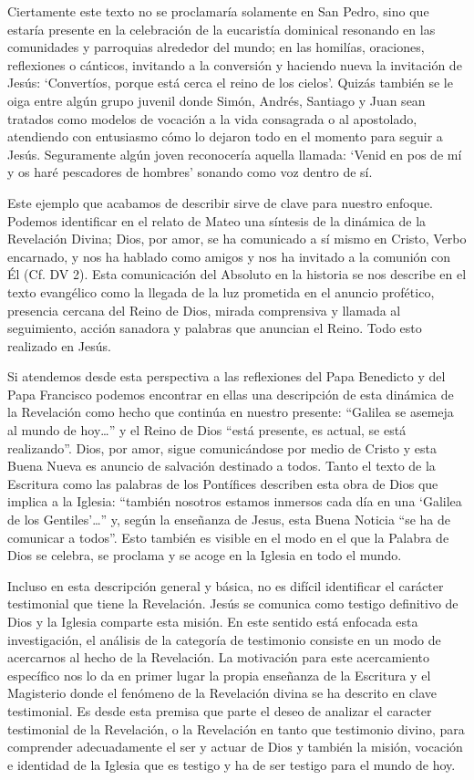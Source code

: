 Ciertamente este texto no se proclamaría solamente en San Pedro, sino que estaría presente en la celebración de la eucaristía dominical resonando en las comunidades y parroquias alrededor del mundo; en las homilías, oraciones, reflexiones o cánticos, invitando a la conversión y haciendo nueva la invitación de Jesús: \enquote*{Convertíos, porque está cerca el reino de los cielos}. Quizás también se le oiga entre algún grupo juvenil donde Simón, Andrés, Santiago y Juan sean tratados como modelos de vocación a la vida consagrada o al apostolado, atendiendo con entusiasmo cómo lo dejaron todo en el momento para seguir a Jesús. Seguramente algún joven reconocería aquella llamada: \enquote*{Venid en pos de mí y os haré pescadores de hombres} sonando como voz dentro de sí.

Este ejemplo que acabamos de describir sirve de clave para nuestro enfoque. Podemos identificar en el relato de Mateo una síntesis de la dinámica de la Revelación Divina; Dios, por amor, se ha comunicado a sí mismo en Cristo, Verbo encarnado, y nos ha hablado como amigos y nos ha invitado a la comunión con Él (Cf. DV 2). Esta comunicación del Absoluto en la historia se nos describe en el texto evangélico como la llegada de la luz prometida en el anuncio profético, presencia cercana del Reino de Dios, mirada comprensiva y llamada al seguimiento, acción sanadora y palabras que anuncian el Reino. Todo esto realizado en Jesús.

Si atendemos desde esta perspectiva a las reflexiones del Papa Benedicto y del Papa Francisco podemos encontrar en ellas una descripción de esta dinámica de la Revelación como hecho que continúa en nuestro presente: ``Galilea se asemeja al mundo de hoy\ldots'' y el Reino de Dios ``está presente, es actual, se está realizando''. Dios, por amor, sigue comunicándose por medio de Cristo y esta Buena Nueva es anuncio de salvación destinado a todos. Tanto el texto de la Escritura como las palabras de los Pontífices describen esta obra de Dios que implica a la Iglesia: ``también nosotros estamos inmersos cada día en una `Galilea de los Gentiles'\ldots'' y, según la enseñanza de Jesus, esta Buena Noticia ``se ha de comunicar a todos''. Esto también es visible en el modo en el que la Palabra de Dios se celebra, se proclama y se acoge en la Iglesia en todo el mundo.

Incluso en esta descripción general y básica, no es difícil identificar el carácter testimonial que tiene la Revelación. Jesús se comunica como testigo definitivo de Dios y la Iglesia comparte esta misión. En este sentido está enfocada esta investigación, el análisis de la categoría de testimonio consiste en un modo de acercarnos al hecho de la Revelación. La motivación para este acercamiento específico nos lo da en primer lugar la propia enseñanza de la Escritura y el Magisterio donde el fenómeno de la Revelación divina se ha descrito en clave testimonial. Es desde esta premisa que parte el deseo de analizar el caracter testimonial de la Revelación, o la Revelación en tanto que testimonio divino, para comprender adecuadamente el ser y actuar de Dios y también la misión, vocación e identidad de la Iglesia que es testigo y ha de ser testigo para el mundo de hoy.

